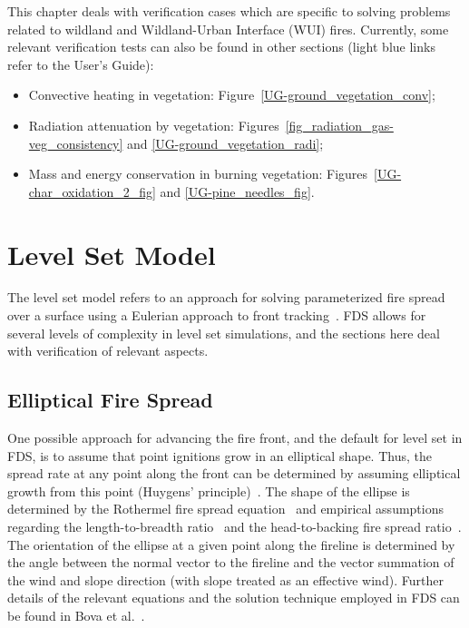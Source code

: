 \documentclass[11pt]{book}
\begin{document}
This chapter deals with verification cases which are specific to solving problems related to wildland and Wildland-Urban Interface (WUI) fires. Currently, some relevant verification tests can also be found in other sections (light blue links refer to the User's Guide):
\begin{itemize}
  \item Convective heating in vegetation: Figure~\ref{UG-ground_vegetation_conv};
  \item Radiation attenuation by vegetation: Figures~\ref{fig_radiation_gas-veg_consistency} and \ref{UG-ground_vegetation_radi};
  \item Mass and energy conservation in burning vegetation: Figures~\ref{UG-char_oxidation_2_fig} and \ref{UG-pine_needles_fig}.
\end{itemize}

\section{Level Set Model}

The level set model refers to an approach for solving parameterized fire spread over a surface using a Eulerian approach to front tracking~\cite{Rehm:LevelSet}. FDS allows for several levels of complexity in level set simulations, and the sections here deal with verification of relevant aspects.

\subsection{Elliptical Fire Spread}
One possible approach for advancing the fire front, and the default for level set in FDS, is to assume that point ignitions grow in an elliptical shape. Thus, the spread rate at any point along the front can be determined by assuming elliptical growth from this point (Huygens' principle)~\cite{Richards:1990,Finney:FARSITE}. The shape of the ellipse is determined by the Rothermel fire spread equation~\cite{Rothermel:1972} and empirical assumptions regarding the length-to-breadth ratio~\cite{Anderson:1983} and the head-to-backing fire spread ratio~\cite{Finney:FARSITE}. The orientation of the ellipse at a given point along the fireline is determined by the angle between the normal vector to the fireline and the vector summation of the wind and slope direction (with slope treated as an effective wind). Further details of the relevant equations and the solution technique employed in FDS can be found in Bova et al.~\cite{Bova:IJWF2015}.
\end{document}

